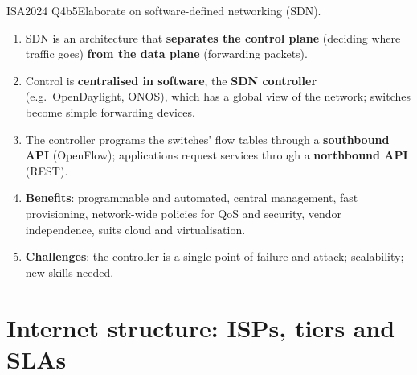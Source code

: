 \documentclass[10pt]{article}
\begin{document}
\begin{pastq}{ISA2024 Q4b}{5}Elaborate on software-defined networking (SDN).\end{pastq}
\begin{ans}
\begin{enumerate}
\item SDN is an architecture that \textbf{separates the control plane} (deciding where traffic goes) \textbf{from the data plane} (forwarding packets).
\item Control is \textbf{centralised in software}, the \textbf{SDN controller} (e.g.\ OpenDaylight, ONOS), which has a global view of the network; switches become simple forwarding devices.
\item The controller programs the switches' flow tables through a \textbf{southbound API} (OpenFlow); applications request services through a \textbf{northbound API} (REST).
\item \textbf{Benefits}: programmable and automated, central management, fast provisioning, network-wide policies for QoS and security, vendor independence, suits cloud and virtualisation.
\item \textbf{Challenges}: the controller is a single point of failure and attack; scalability; new skills needed.
\end{enumerate}
\end{ans}

\section{Internet structure: ISPs, tiers and SLAs}
\end{document}

